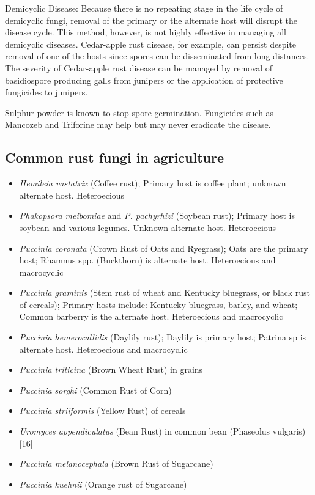 \documentclass[
]{book}
\providecommand{\tightlist}{%
  \setlength{\itemsep}{0pt}\setlength{\parskip}{0pt}}
\begin{document}
Demicyclic Disease: Because there is no repeating stage in the life cycle of demicyclic fungi, removal of the primary or the alternate host will disrupt the disease cycle. This method, however, is not highly effective in managing all demicyclic diseases. Cedar-apple rust disease, for example, can persist despite removal of one of the hosts since spores can be disseminated from long distances. The severity of Cedar-apple rust disease can be managed by removal of basidiospore producing galls from junipers or the application of protective fungicides to junipers.

Sulphur powder is known to stop spore germination. Fungicides such as Mancozeb and Triforine may help but may never eradicate the disease.

\hypertarget{common-rust-fungi-in-agriculture}{%
\subsection{Common rust fungi in agriculture}\label{common-rust-fungi-in-agriculture}}

\begin{itemize}
\tightlist
\item
  \emph{Hemileia vastatrix} (Coffee rust); Primary host is coffee plant; unknown alternate host. Heteroecious
\item
  \emph{Phakopsora meibomiae} and \emph{P. pachyrhizi} (Soybean rust); Primary host is soybean and various legumes. Unknown alternate host. Heteroecious
\item
  \emph{Puccinia coronata} (Crown Rust of Oats and Ryegrass); Oats are the primary host; Rhamnus spp. (Buckthorn) is alternate host. Heteroecious and macrocyclic
\item
  \emph{Puccinia graminis} (Stem rust of wheat and Kentucky bluegrass, or black rust of cereals); Primary hosts include: Kentucky bluegrass, barley, and wheat; Common barberry is the alternate host. Heteroecious and macrocyclic
\item
  \emph{Puccinia hemerocallidis} (Daylily rust); Daylily is primary host; Patrina sp is alternate host. Heteroecious and macrocyclic
\item
  \emph{Puccinia triticina} (Brown Wheat Rust) in grains
\item
  \emph{Puccinia sorghi} (Common Rust of Corn)
\item
  \emph{Puccinia striiformis} (Yellow Rust) of cereals
\item
  \emph{Uromyces appendiculatus} (Bean Rust) in common bean (Phaseolus vulgaris){[}16{]}
\item
  \emph{Puccinia melanocephala} (Brown Rust of Sugarcane)
\item
  \emph{Puccinia kuehnii} (Orange rust of Sugarcane)
\end{itemize}
\end{document}
